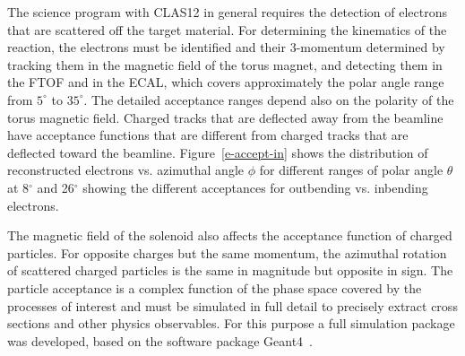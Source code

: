\documentclass[final,3p]{elsarticle}
\begin{document}
\begin{twocolumn}
The science program with CLAS12 in general requires the detection of electrons that are scattered off the target
material. For determining the kinematics of the reaction, the electrons must be identified and their 3-momentum
determined by tracking them in the magnetic field of the torus magnet, and detecting them in the FTOF and in the
ECAL, which covers approximately the polar angle range from $5^\circ$ to $35^\circ$. The detailed acceptance
ranges depend also on the polarity of the torus magnetic field. Charged tracks that are deflected away from the
beamline have acceptance functions that are different from charged tracks that are deflected toward the beamline.
Figure~\ref{e-accept-in} shows the distribution of reconstructed electrons vs. azimuthal angle $\phi$ for different
ranges of polar angle $\theta$ at 8$^\circ$ and 26$^\circ$ showing the different acceptances for outbending vs.
inbending electrons.

The magnetic field of the solenoid also affects the acceptance function of charged particles. For opposite charges but
the same momentum, the azimuthal rotation of scattered charged particles is the same in magnitude but opposite in
sign. The particle acceptance is a complex function of the phase space covered by the processes of interest and 
must be simulated in full detail to precisely extract cross sections and other physics observables.  For this purpose 
a full simulation package was developed, based on the software package Geant4~\cite{GEMC}. 


\end{twocolumn}
\end{document}
